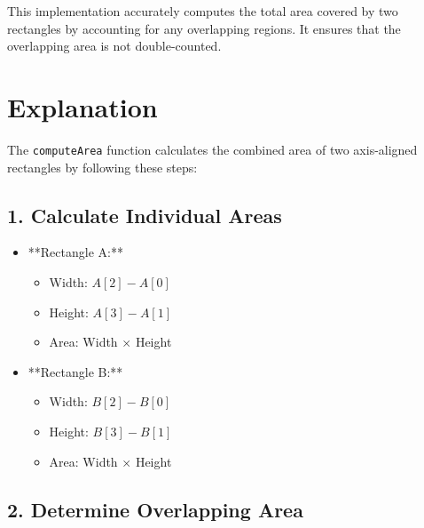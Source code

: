 This implementation accurately computes the total area covered by two rectangles by accounting for any overlapping regions. It ensures that the overlapping area is not double-counted.

\section*{Explanation}

The \texttt{computeArea} function calculates the combined area of two axis-aligned rectangles by following these steps:

\subsection*{1. Calculate Individual Areas}

\begin{itemize}
    \item **Rectangle A:**
    \begin{itemize}
        \item Width: \(A[2] - A[0]\)
        \item Height: \(A[3] - A[1]\)
        \item Area: Width \(\times\) Height
    \end{itemize}
    
    \item **Rectangle B:**
    \begin{itemize}
        \item Width: \(B[2] - B[0]\)
        \item Height: \(B[3] - B[1]\)
        \item Area: Width \(\times\) Height
    \end{itemize}
\end{itemize}

\subsection*{2. Determine Overlapping Area}

